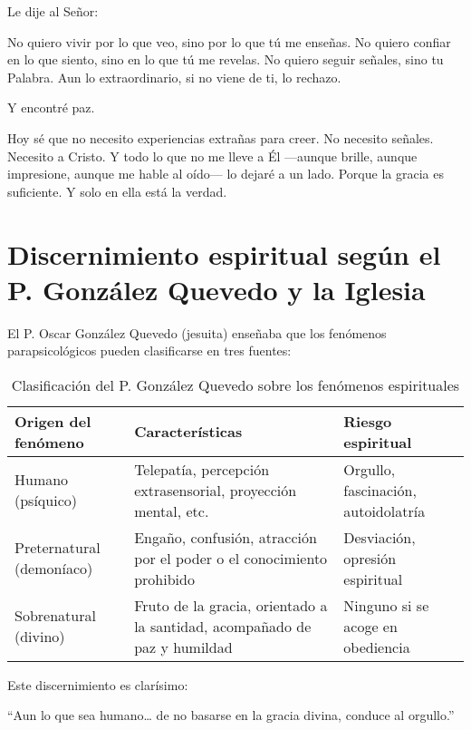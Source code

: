 \documentclass[12pt,a4paper]{article}
\begin{document}
	Le dije al Señor:
	\begin{displayquote}
		No quiero vivir por lo que veo, sino por lo que tú me enseñas. No quiero confiar en lo que siento, sino en lo que tú me revelas. No quiero seguir señales, sino tu Palabra. Aun lo extraordinario, si no viene de ti, lo rechazo.
	\end{displayquote}
	
	Y encontré paz.
	
	Hoy sé que no necesito experiencias extrañas para creer. No necesito señales. Necesito a Cristo. Y todo lo que no me lleve a Él —aunque brille, aunque impresione, aunque me hable al oído— lo dejaré a un lado. Porque la gracia es suficiente. Y solo en ella está la verdad.

\section*{Discernimiento espiritual según el P. González Quevedo y la Iglesia}

El P. Oscar González Quevedo (jesuita) enseñaba que los fenómenos parapsicológicos pueden clasificarse en tres fuentes:
\begin{table}[h!]
	\centering
	\renewcommand{\arraystretch}{1.3}
	\begin{tabularx}{\textwidth}{|>{\raggedright\arraybackslash}X|
			>{\raggedright\arraybackslash}X|
			>{\raggedright\arraybackslash}X|}
		\hline
		\textbf{Origen del fenómeno} & \textbf{Características} & \textbf{Riesgo espiritual} \\
		\hline
		Humano (psíquico) &
		Telepatía, percepción extrasensorial, proyección mental, etc. &
		Orgullo, fascinación, autoidolatría \\
		\hline
		Preternatural (demoníaco) &
		Engaño, confusión, atracción por el poder o el conocimiento prohibido &
		Desviación, opresión espiritual \\
		\hline
		Sobrenatural (divino) &
		Fruto de la gracia, orientado a la santidad, acompañado de paz y humildad &
		Ninguno si se acoge en obediencia \\
		\hline
	\end{tabularx}
	\caption{Clasificación del P. González Quevedo sobre los fenómenos espirituales}
\end{table}

Este discernimiento es clarísimo:

\begin{displayquote}
	“Aun lo que sea humano… de no basarse en la gracia divina, conduce al orgullo.”
\end{displayquote}
\end{document}
